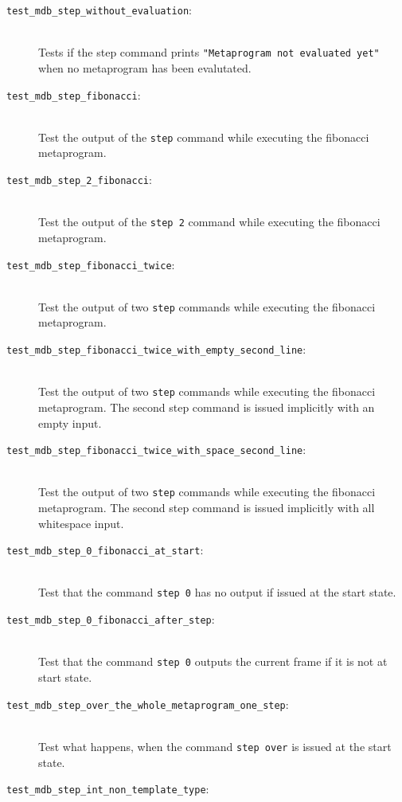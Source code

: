 \begin{description}
    \item[\texttt{test\_mdb\_step\_without\_evaluation}:] \hfill \\
        Tests if the step command prints
        \texttt{"Metaprogram not evaluated yet"} when no metaprogram has been
        evalutated.
    \item[\texttt{test\_mdb\_step\_fibonacci}:] \hfill \\
        Test the output of the \texttt{step} command while executing the
        fibonacci metaprogram.
    \item[\texttt{test\_mdb\_step\_2\_fibonacci}:] \hfill \\
        Test the output of the \texttt{step 2} command while executing the
        fibonacci metaprogram.
    \item[\texttt{test\_mdb\_step\_fibonacci\_twice}:] \hfill \\
        Test the output of two \texttt{step} commands while executing the
        fibonacci metaprogram.
    \item[\texttt{test\_mdb\_step\_fibonacci\_twice\_with\_empty\_second\_line}:] \hfill \\
        Test the output of two \texttt{step} commands while executing the
        fibonacci metaprogram. The second step command is issued implicitly
        with an empty input.
    \item[\texttt{test\_mdb\_step\_fibonacci\_twice\_with\_space\_second\_line}:] \hfill \\
        Test the output of two \texttt{step} commands while executing the
        fibonacci metaprogram. The second step command is issued implicitly
        with all whitespace input.
    \item[\texttt{test\_mdb\_step\_0\_fibonacci\_at\_start}:] \hfill \\
        Test that the command \texttt{step 0} has no output if issued at the
        start state.
    \item[\texttt{test\_mdb\_step\_0\_fibonacci\_after\_step}:] \hfill \\
        Test that the command \texttt{step 0} outputs the current frame if it
        is not at start state.
    \item[\texttt{test\_mdb\_step\_over\_the\_whole\_metaprogram\_one\_step}:] \hfill \\
        Test what happens, when the command \texttt{step over} is issued at the
        start state.
    \item[\texttt{test\_mdb\_step\_int\_non\_template\_type}:] \hfill \\

\end{description}
